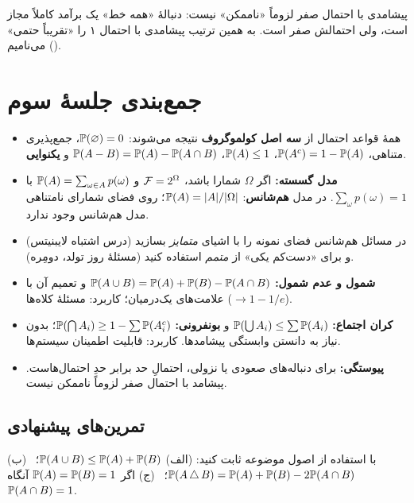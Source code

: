\begin{note}
پیشامدی با احتمال صفر لزوماً «ناممکن» نیست: دنبالهٔ «همه خط» یک برآمد کاملاً مجاز است، ولی احتمالش صفر است. به همین ترتیب پیشامدی با احتمال ۱ را «تقریباً حتمی» () می‌نامیم.
\end{note}

\section*{جمع‌بندی جلسهٔ سوم}

\begin{summary}
\begin{itemize}
  \item همهٔ قواعد احتمال از \textbf{سه اصل کولموگروف} نتیجه می‌شوند: $\P(\varnothing)=0$، جمع‌پذیری متناهی، $\P(A^c)=1-\P(A)$، $\P(A)\le1$، $\P(A-B)=\P(A)-\P(A\cap B)$ و \textbf{یکنوایی}.
  \item \textbf{مدل گسسته:} اگر $\Omega$ شمارا باشد، $\F=2^\Omega$ و $\P(A)=\sum_{\omega\in A}p(\omega)$ با $\sum_\omega p(\omega)=1$. در مدل \textbf{هم‌شانس}: $\P(A)=|A|/|\Omega|$؛ روی فضای شمارای نامتناهی مدل هم‌شانس وجود ندارد.
  \item در مسائل هم‌شانس فضای نمونه را با اشیای \emph{متمایز} بسازید (درس اشتباه لایبنیتس) و برای «دست‌کم یکی» از \emph{متمم} استفاده کنید (مسئلهٔ روز تولد، دومِره).
  \item \textbf{شمول و عدم شمول:} $\P(A\cup B)=\P(A)+\P(B)-\P(A\cap B)$ و تعمیم آن با علامت‌های یک‌درمیان؛ کاربرد: مسئلهٔ کلاه‌ها ($\to1-1/e$).
  \item \textbf{کران اجتماع:} $\P(\bigcup A_i)\le\sum\P(A_i)$ و \textbf{بونفرونی:} $\P(\bigcap A_i)\ge1-\sum\P(A_i^c)$؛ بدون نیاز به دانستن وابستگی پیشامدها. کاربرد: قابلیت اطمینان سیستم‌ها.
  \item \textbf{پیوستگی:} برای دنباله‌های صعودی یا نزولی، احتمالِ حد برابر حدِ احتمال‌هاست. پیشامد با احتمال صفر لزوماً ناممکن نیست.
\end{itemize}
\end{summary}



\subsection*{تمرین‌های پیشنهادی}

\begin{exercise}
با استفاده از اصول موضوعه ثابت کنید: (الف) $\P(A\cup B)\le\P(A)+\P(B)$؛ \ (ب) $\P(A\,\triangle\,B)=\P(A)+\P(B)-2\P(A\cap B)$؛ \ (ج) اگر $\P(A)=\P(B)=1$ آنگاه $\P(A\cap B)=1$.
\end{exercise}

